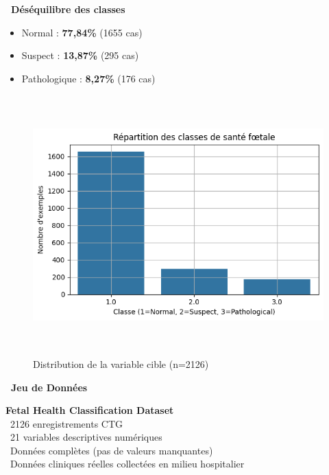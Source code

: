 \documentclass[a0,landscape]{a0poster}
\newcommand{\bigsection}[1]{
  \vspace{0.5cm}
  \begin{tcolorbox}[
    colback=primaryblue,
    coltext=white,
    arc=2mm,
    boxrule=0pt,
    left=10pt,
    right=10pt,
    top=5pt,
    bottom=5pt
  ]
    {\Large\bfseries #1\par}
  \end{tcolorbox}
  \vspace{0.3cm}
}
\begin{document}
\begin{multicols}{3}
\begin{minipage}[t]{0.5\linewidth}
\begin{warningbox}
\textbf{\faExclamationTriangle\ Déséquilibre des classes}
\begin{itemize}[leftmargin=1em]
  \item Normal : \textbf{77,84\%} (1655 cas)
  \item Suspect : \textbf{13,87\%} (295 cas)  
  \item Pathologique : \textbf{8,27\%} (176 cas)
\end{itemize}
\end{warningbox}
\end{minipage}%
\hfill  %
\begin{minipage}[t]{0.45\linewidth}  %
\begin{figure}[H]
  \centering
  \includegraphics[width=\linewidth,height=10cm,keepaspectratio]{distribution_classes.png}
  \caption{Distribution de la variable cible (n=2126)}
  \label{fig:distrib_classes}
\end{figure}
\end{minipage}

\vspace{0.5cm}
\vspace{1em}
\bigsection{\faDatabase\ Jeu de Données}

\begin{infobox}
\textbf{Fetal Health Classification Dataset}\\
\faFile\ 2126 enregistrements CTG\\
\faList\ 21 variables descriptives numériques\\
\faCheckCircle\ Données complètes (pas de valeurs manquantes)\\
\faHospital\ Données cliniques réelles collectées en milieu hospitalier
\end{infobox}


\end{multicols}
\end{document}
